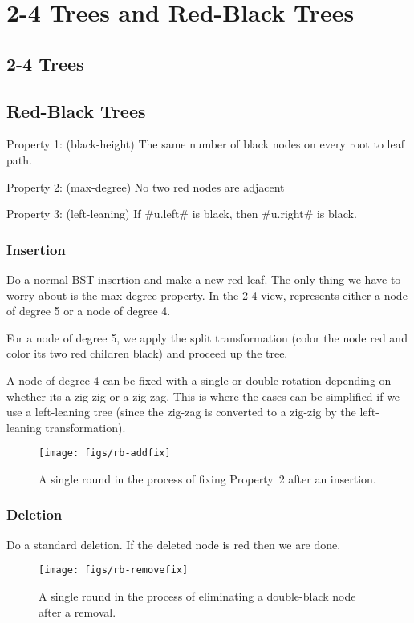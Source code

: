 \chapter{2-4 Trees and Red-Black Trees}
\section{2-4 Trees}
\section{Red-Black Trees}

Property 1: (black-height) The same number of black nodes on every root to leaf path.

Property 2: (max-degree) No two red nodes are adjacent

Property 3: (left-leaning) If #u.left# is black, then #u.right# is black.

\subsection{Insertion}

Do a normal BST insertion and make a new red leaf.  The only thing we
have to worry about is the max-degree property.  In the 2-4 view, represents
either a node of degree 5 or a node of degree 4.

For a node of degree 5, we apply the split transformation (color the
node red and color its two red children black) and proceed up the tree.

A node of degree 4 can be fixed with a single or double rotation depending
on whether its a zig-zig or a zig-zag.  This is where the cases can be
simplified if we use a left-leaning tree (since the zig-zag is converted
to a zig-zig by the left-leaning transformation).


\begin{figure}
  \begin{center}
    \texttt{[image: figs/rb-addfix]}
  \end{center}
  \caption{A single round in the process of fixing Property~2 after
  an insertion.}
\end{figure}

\subsection{Deletion}

Do a standard deletion.  If the deleted node is red then we are done.

\begin{figure}
  \begin{center}
    \texttt{[image: figs/rb-removefix]}
  \end{center}
  \caption{A single round in the process of eliminating a double-black node
   after a removal.}
\end{figure}


